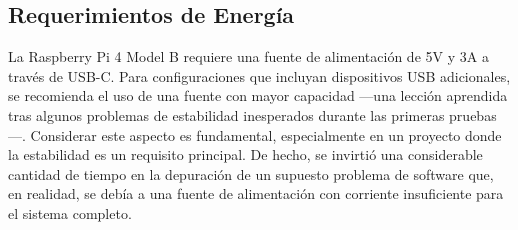     \subsection{Requerimientos de Energía}
    La Raspberry Pi 4 Model B requiere una fuente de alimentación de 5V y 3A a través de USB-C. Para configuraciones que incluyan dispositivos USB adicionales, se recomienda el uso de una fuente con mayor capacidad —una lección aprendida tras algunos problemas de estabilidad inesperados durante las primeras pruebas—. Considerar este aspecto es fundamental, especialmente en un proyecto donde la estabilidad es un requisito principal. De hecho, se invirtió una considerable cantidad de tiempo en la depuración de un supuesto problema de software que, en realidad, se debía a una fuente de alimentación con corriente insuficiente para el sistema completo.

